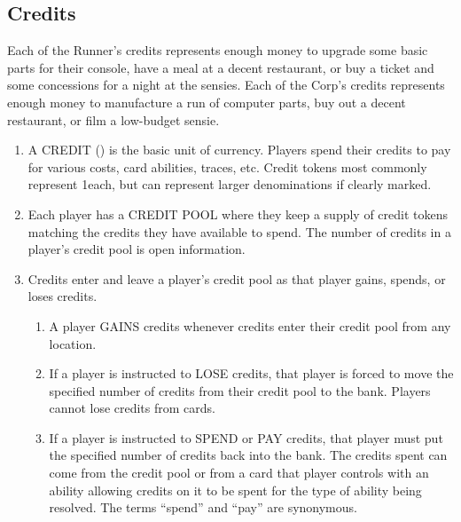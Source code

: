 \subsection{Credits}
Each of the Runner's credits represents enough money to upgrade some basic parts for their console, have a meal at a decent restaurant, or buy a ticket and some concessions for a night at the sensies.
Each of the Corp's credits represents enough money to manufacture a run of computer parts, buy out a decent restaurant, or film a low-budget sensie.
\begin{enumerate}
	\item A CREDIT (\credit) is the basic unit of currency. Players spend their credits to pay for various costs, card abilities, traces, etc. Credit tokens most commonly represent 1\credit each, but can represent larger denominations if clearly marked.
	\item  Each player has a CREDIT POOL where they keep a supply of credit tokens matching the credits they have available to spend. The number of credits in a player's credit pool is open information.
	\item Credits enter and leave a player's credit pool as that player gains, spends, or loses credits.
	      \begin{enumerate}
		      \item A player GAINS credits whenever credits enter their credit pool from any location.
		      \item If a player is instructed to LOSE credits, that player is forced to move the specified number of credits from their credit pool to the bank. Players cannot lose credits from cards.\\[10pt]
		      \item If a player is instructed to SPEND or PAY credits, that player must put the specified	number of credits back into the bank. The credits spent can come from the credit pool or from a card that player controls with an ability allowing credits on it to be spent for the type of ability being resolved. \textcolor{Bittersweet}{The terms ``spend'' and ``pay'' are synonymous.}\\[10pt]
		            \\[10pt]

\end{enumerate}
\end{enumerate}
